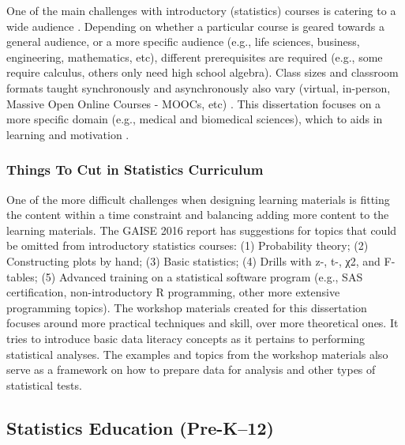 \documentclass[010-intro.tex]{subfiles}
\begin{document}
    One of the main challenges with introductory (statistics) courses is catering to a wide audience
    \cite{gaise2016}.
    Depending on whether a particular course is geared towards a general audience, or a more specific audience
    (e.g., life sciences, business, engineering, mathematics, etc),
    different prerequisites are required
    (e.g., some require calculus, others only need high school algebra).
    Class sizes and classroom formats taught synchronously and asynchronously also vary
    (virtual, in-person, Massive Open Online Courses - MOOCs, etc)
    \cite{gaise2016}.
    This dissertation focuses on a more specific domain (e.g., medical and biomedical sciences),
    which to aids in learning and motivation
    \cite{ambrose2010learning, wilson2019teaching, krossDemocratizationDataScience2020}.

    \subsubsection{Things To Cut in Statistics Curriculum}

        One of the more difficult challenges when designing learning materials is fitting the content within a time constraint
        and balancing adding more content to the learning materials. %
        The GAISE 2016 report has suggestions for topics that could be omitted from introductory statistics courses:
        (1) Probability theory;
        (2) Constructing plots by hand;
        (3) Basic statistics;
        (4) Drills with z-, t-, χ2, and F-tables;
        (5) Advanced training on a statistical software program
            (e.g., SAS certification, non-introductory R programming, other more extensive programming topics).
        The workshop materials created for this dissertation
        focuses around more practical techniques and skill, over more theoretical ones.
        It tries to introduce basic data literacy concepts as it pertains to performing statistical analyses.
        The examples and topics from the workshop materials
        also serve as a framework on how to prepare data for analysis and other types of statistical tests.

        \vfill

\subsection{Statistics Education (Pre-K–12)}
\label{sse:statsk12}
\end{document}

